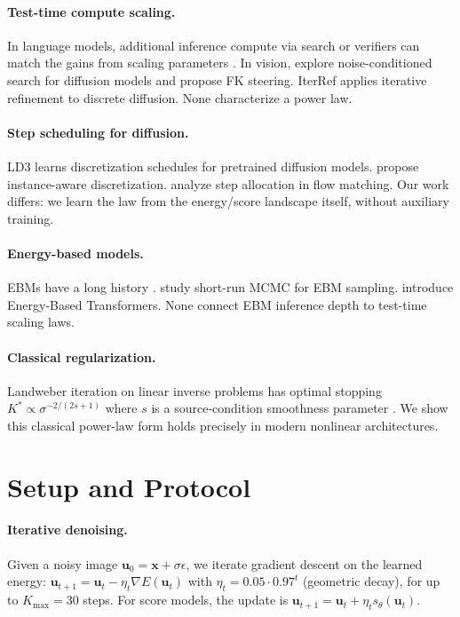 \documentclass[letterpaper]{article}
\newcommand{\xx}{\mathbf{x}}
\newcommand{\uu}{\mathbf{u}}
\begin{document}
\paragraph{Test-time compute scaling.}
In language models, additional inference compute via search or
verifiers can match the gains from scaling parameters
\citep{snell2024llm}.
In vision, \citet{ma2025inference} explore noise-conditioned search
for diffusion models and \citet{singhal2025fk} propose FK steering.
IterRef \citep{iterref2025} applies iterative refinement to
discrete diffusion.
None characterize a power law.

\paragraph{Step scheduling for diffusion.}
LD3 \citep{tong2025ld3} learns discretization schedules for
pretrained diffusion models.
\citet{yuan2026cvpr} propose instance-aware discretization.
\citet{pei2025steps} analyze step allocation in flow matching.
Our work differs: we learn the law from the energy/score landscape
itself, without auxiliary training.

\paragraph{Energy-based models.}
EBMs have a long history \citep{lecun2006ebm,du2019implicit}.
\citet{nijkamp2019anatomy} study short-run MCMC for EBM sampling.
\citet{goyal2025ebt} introduce Energy-Based Transformers.
None connect EBM inference depth to test-time scaling laws.

\paragraph{Classical regularization.}
Landweber iteration on linear inverse problems has optimal stopping
$K^* \propto \sigma^{-2/(2s+1)}$ where $s$ is a source-condition
smoothness parameter \citep{engl1996regularization,raskutti2014early}.
We show this classical power-law form holds precisely in modern
nonlinear architectures.

\section{Setup and Protocol}
\label{sec:setup}

\paragraph{Iterative denoising.}
Given a noisy image $\uu_0 = \xx + \sigma\epsilon$,
we iterate gradient descent on the learned energy:
$\uu_{t+1} = \uu_t - \eta_t \nabla E(\uu_t)$
with $\eta_t = 0.05 \cdot 0.97^t$ (geometric decay),
for up to $K_{\max} = 30$ steps.
For score models, the update is $\uu_{t+1} = \uu_t + \eta_t s_\theta(\uu_t)$.
\end{document}

